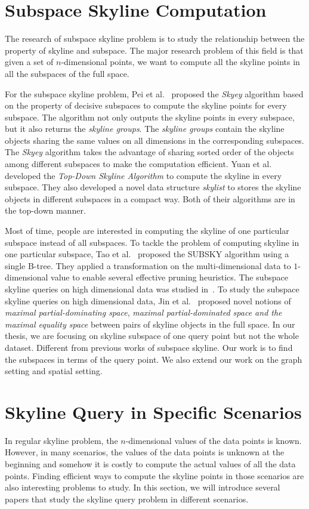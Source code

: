 \section{Subspace Skyline Computation}
\label{sec:rel:subspace}
The research of subspace skyline problem is to study the relationship between the property of skyline and subspace. The major research problem of this field is that given a set of $n$-dimensional points, we want to compute all the skyline points in all the subspaces of the full space.

For the subspace skyline problem, Pei et al.~\cite{pei2005catching} proposed the \emph{Skyey} algorithm based on the property of decisive subspaces to compute the skyline points for every subspace. The algorithm not only outputs the skyline points in every subspace, but it also returns the \emph{skyline groups}. The \emph{skyline groups} contain the skyline objects sharing the same values on all dimensions in the corresponding subspaces.
The \emph{Skyey} algorithm takes the advantage of sharing sorted order of the objects among different subspaces to make the computation efficient. Yuan et al.~\cite{yuan2005efficient} developed the \emph{Top-Down Skyline Algorithm} to compute the skyline in every subspace. They also developed a novel data structure \emph{skylist} to stores the skyline objects in different subspaces in a compact way. 
Both of their algorithms are in the top-down manner.

Most of time, people are interested in computing the skyline of one particular subspace instead of all subspaces. To tackle the problem of computing skyline in one particular subspace, Tao et al.~\cite{tao2006subsky} proposed the SUBSKY algorithm using a single B-tree. They applied a transformation on the multi-dimensional data to $1$-dimensional value to enable several effective pruning heuristics.
The subspace skyline queries on high dimensional data was studied in~\cite{jin2007efficient}. To study the subspace skyline queries on high dimensional data, Jin et al.~\cite{jin2007efficient} proposed novel notions of \emph{maximal partial-dominating space}, \emph{maximal partial-dominated space and the maximal equality space} between pairs of skyline objects in the full space. In our thesis, we are focusing on skyline subspace of one query point but not the whole dataset. Different from previous works of subspace skyline. Our work is to find the subspaces in terms of the query point. We also extend our work on the graph setting and spatial setting.

\section{Skyline Query in Specific Scenarios}
\label{sec:rel:constrain}
In regular skyline problem, the $n$-dimensional values of the data points is known. However, in many scenarios, the values of the data points is unknown at the beginning and somehow it is costly to compute the actual values of all the data points. Finding efficient ways to compute the skyline points in those scenarios are also interesting problems to study. In this section, we will introduce several papers that study the skyline query problem in different scenarios.

